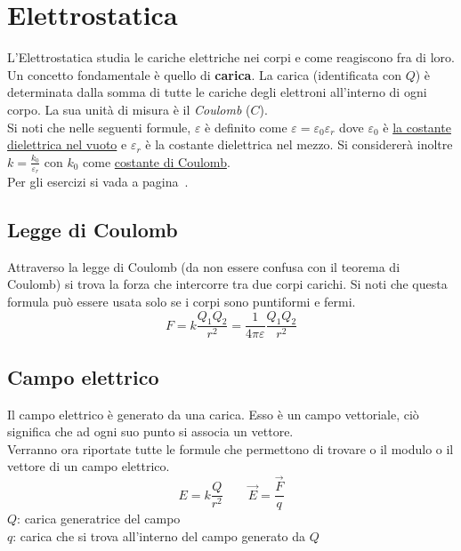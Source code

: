 
\section{Elettrostatica}\label{sec:elettrostatica}
L'Elettrostatica studia le cariche elettriche nei corpi e come reagiscono fra di loro.\\
Un concetto fondamentale è quello di \textbf{carica}. La carica (identificata con $Q$) è determinata 
dalla somma di tutte le cariche degli elettroni all'interno di ogni corpo. La sua unità di misura è il 
\emph{Coulomb} ($C$).\\[\baselineskip]
Si noti che nelle seguenti formule, $\varepsilon$ è definito come 
$\varepsilon = \varepsilon_0\varepsilon_r$ dove $\varepsilon_0$ è \hyperref[tab:e0]{la costante
dielettrica nel vuoto} e $\varepsilon_r$ è la costante dielettrica nel mezzo. Si considererà 
inoltre $k = \frac{k_0}{\varepsilon_r}$ con $k_0$ come \hyperref[tab:k0]{costante di Coulomb}.\\
Per gli esercizi si vada a pagina~\pageref{ex:elettrostatica}.

\subsection{Legge di Coulomb}
Attraverso la legge di Coulomb (da non essere confusa con il teorema di Coulomb) si trova la forza che 
intercorre tra due corpi carichi. Si noti che questa formula può essere usata solo se i corpi sono 
puntiformi e fermi.
\begin{equation*}
  F = k\frac{Q_1Q_2}{r^2} = \frac{1}{4\pi\varepsilon}\frac{Q_1Q_2}{r^2}
\end{equation*}

\subsection{Campo elettrico}
Il campo elettrico è generato da una carica. Esso è un campo vettoriale, ciò significa che ad ogni
suo punto si associa un vettore.\\ 
Verranno ora riportate tutte le formule che permettono di trovare o il modulo o il vettore di un
campo elettrico.
\begin{equation*}
  E = k\frac{Q}{r^2}\qquad \vec{E} = \frac{\vec{F}}{q}
\end{equation*}
$Q$: carica generatrice del campo\\
$q$: carica che si trova all'interno del campo generato da $Q$

